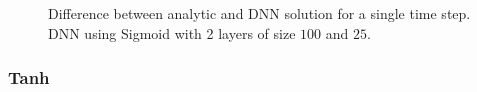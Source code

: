 \documentclass{article}
\theoremstyle{definition}
\begin{document}
\begin{figure}[H]
    \centering
    \qquad
    \caption{Difference between analytic and DNN solution for a single time step. DNN using Sigmoid with 2 layers of size $100$ and $25$.}
    \label{fig:diff_DNN_Sigmoid_single_step}
\end{figure}

\subsubsection{Tanh}
\end{document}
